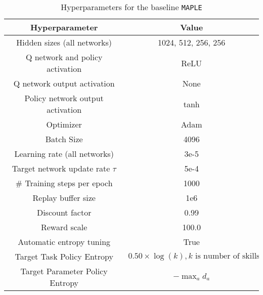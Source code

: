 \begin{table}[h!]
\centering
\begin{tabular}{|c|c|}
\hline
\textbf{Hyperparameter} & \textbf{Value} \\ \hline
Hidden sizes (all networks) & 1024, 512, 256, 256 \\ \hline
Q network and policy activation & ReLU \\ 
Q network output activation & None \\ 
Policy network output activation & tanh \\ \hline
Optimizer & Adam \\ 
Batch Size & 4096 \\ 
Learning rate (all networks) & 3e-5 \\ 
Target network update rate \( \tau \) & 5e-4 \\ \hline
\# Training steps per epoch & 1000 \\ 
Replay buffer size & 1e6 \\ 
 \hline
Discount factor & 0.99 \\ 
Reward scale & 100.0 \\ 
Automatic entropy tuning & True \\ 
Target Task Policy Entropy & \( 0.50 \times \log(k), k \text{ is number of skills} \) \\ 
Target Parameter Policy Entropy & \( -\max_a d_a \) \\ \hline
\end{tabular}
\caption{Hyperparameters for the baseline \texttt{MAPLE}}\label{tab:baseline_maple_hyperparams}
\end{table}